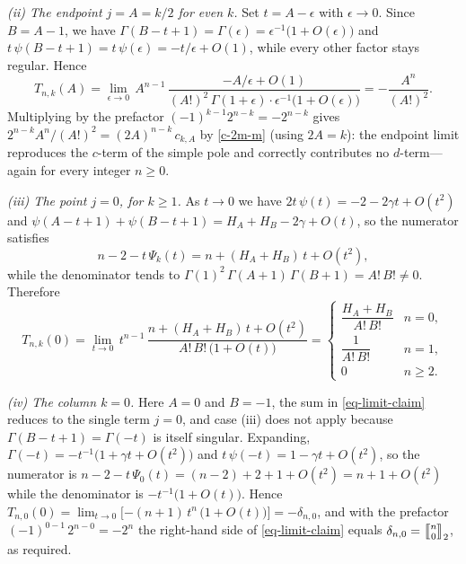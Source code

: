 \documentclass[a4paper]{amsart}
\numberwithin{equation}{section}
\newcommand{\mStirling}[0]{\genfrac{\llbracket}{\rrbracket}{0pt}{}}
\begin{document}
\emph{(ii) The endpoint $j = A = k/2$ for even $k$.} Set $t = A - \epsilon$ with $\epsilon \to 0$. Since $B = A - 1$, we have $\Gamma(B-t+1) = \Gamma(\epsilon) = \epsilon^{-1}\big(1 + O(\epsilon)\big)$ and $t\,\psi(B-t+1) = t\,\psi(\epsilon) = -t/\epsilon + O(1)$, while every other factor stays regular. Hence
\[
T_{n,k}(A) = \lim_{\epsilon \to 0}\, A^{n-1}\,\frac{-A/\epsilon + O(1)}{(A!)^2\,\Gamma(1+\epsilon)\cdot\epsilon^{-1}\big(1+O(\epsilon)\big)} = -\frac{A^{n}}{(A!)^2}.
\]
Multiplying by the prefactor $(-1)^{k-1}2^{n-k} = -2^{n-k}$ gives $2^{n-k}A^{n}/(A!)^2 = (2A)^{n-k}\,c_{k,A}$ by \eqref{c-2m-m} (using $2A = k$): the endpoint limit reproduces the $c$-term of the simple pole and correctly contributes no $d$-term---again for every integer $n \geq 0$.

\emph{(iii) The point $j = 0$, for $k \geq 1$.} As $t \to 0$ we have $2t\,\psi(t) = -2 - 2\gamma t + O(t^2)$ and $\psi(A-t+1) + \psi(B-t+1) = H_A + H_B - 2\gamma + O(t)$, so the numerator satisfies
\[
n - 2 - t\,\Psi_k(t) = n + (H_A + H_B)\,t + O(t^2),
\]
while the denominator tends to $\Gamma(1)^2\,\Gamma(A+1)\,\Gamma(B+1) = A!\,B! \neq 0$. Therefore
\begin{equation}\label{eq-j0-limits}
T_{n,k}(0) = \lim_{t \to 0}\, t^{n-1}\,\frac{n + (H_A+H_B)\,t + O(t^2)}{A!\,B!\,\big(1+O(t)\big)} =
\begin{cases}
\dfrac{H_A + H_B}{A!\,B!} & n = 0,\\[8pt]
\dfrac{1}{A!\,B!} & n = 1,\\[6pt]
0 & n \geq 2.
\end{cases}
\end{equation}

\emph{(iv) The column $k = 0$.} Here $A = 0$ and $B = -1$, the sum in \eqref{eq-limit-claim} reduces to the single term $j = 0$, and case (iii) does not apply because $\Gamma(B-t+1) = \Gamma(-t)$ is itself singular. Expanding, $\Gamma(-t) = -t^{-1}\big(1 + \gamma t + O(t^2)\big)$ and $t\,\psi(-t) = 1 - \gamma t + O(t^2)$, so the numerator is $n - 2 - t\,\Psi_0(t) = (n - 2) + 2 + 1 + O(t^2) = n + 1 + O(t^2)$ while the denominator is $-t^{-1}\big(1 + O(t)\big)$. Hence $T_{n,0}(0) = \lim_{t\to0}\big[{-(n+1)}\,t^{n}\,\big(1+O(t)\big)\big] = -\delta_{n,0}$, and with the prefactor $(-1)^{0-1}\,2^{n-0} = -2^{n}$ the right-hand side of \eqref{eq-limit-claim} equals $\delta_{n,0} = \mStirling{n}{0}_2$, as required.
\end{document}
